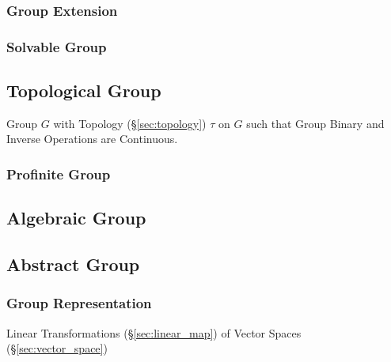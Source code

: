\subsubsection{Group Extension}\label{sec:group_extension}

\subsubsection{Solvable Group}\label{sec:solvable_group}



\subsection{Topological Group}\label{sec:topological_group}

Group $G$ with Topology (\S\ref{sec:topology}) $\tau$ on $G$ such that
Group Binary and Inverse Operations are Continuous.



\subsubsection{Profinite Group}\label{sec:profinite_group}



\subsection{Algebraic Group}\label{sec:algebraic_group}

\subsection{Abstract Group}\label{sec:abstract_group}

\subsubsection{Group Representation}\label{sec:group_representation}

Linear Transformations (\S\ref{sec:linear_map}) of Vector Spaces
(\S\ref{sec:vector_space})



